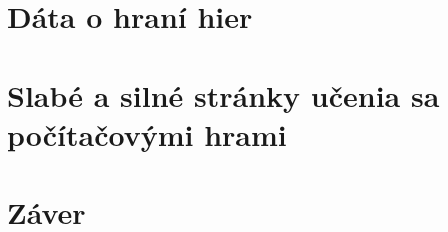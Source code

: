 \documentclass[10pt,twoside,slovak,a4paper]{article}
\begin{document}
\section{Dáta o hraní hier}\label{data-o-hrani}
\section{Slabé a silné stránky učenia sa počítačovými hrami}\label{vyhody-nevyhody-hier}
\section{Záver} \label{zaver}

 

\end{document}
